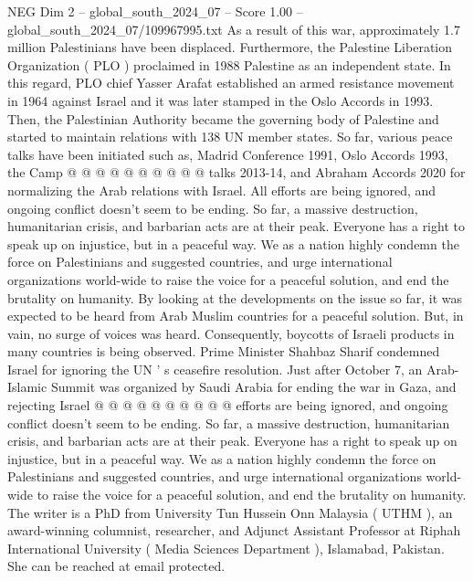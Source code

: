 \begin{textsample}{NEG Dim 2 – global\_south\_2024\_07 – Score 1.00 – global\_south\_2024\_07/109967995.txt}
As a result of this war, approximately 1.7 million Palestinians have been displaced.
Furthermore, the Palestine Liberation Organization ( PLO ) proclaimed in 1988 Palestine as an independent state.
In this regard, PLO chief Yasser Arafat established an armed resistance movement in 1964 against Israel and it was later stamped in the Oslo Accords in 1993.
Then, the Palestinian Authority became the governing body of Palestine and started to maintain relations with 138 UN member states.
So far, various peace talks have been initiated such as, Madrid Conference 1991, Oslo Accords 1993, the Camp @ @ @ @ @ @ @ @ @ @ talks 2013-14, and Abraham Accords 2020 for normalizing the Arab relations with Israel.
All efforts are being ignored, and ongoing conflict doesn't seem to be ending.
So far, a massive destruction, humanitarian crisis, and barbarian acts are at their peak.
Everyone has a right to speak up on injustice, but in a peaceful way.
We as a nation highly condemn the force on Palestinians and suggested countries, and urge international organizations world-wide to raise the voice for a peaceful solution, and end the brutality on humanity.
By looking at the developments on the issue so far, it was expected to be heard from Arab Muslim countries for a peaceful solution.
But, in vain, no surge of voices was heard.
Consequently, boycotts of Israeli products in many countries is being observed.
Prime Minister Shahbaz Sharif condemned Israel for ignoring the UN ' s ceasefire resolution.
Just after October 7, an Arab-Islamic Summit was organized by Saudi Arabia for ending the war in Gaza, and rejecting Israel @ @ @ @ @ @ @ @ @ @ efforts are being ignored, and ongoing conflict doesn't seem to be ending.
So far, a massive destruction, humanitarian crisis, and barbarian acts are at their peak.
Everyone has a right to speak up on injustice, but in a peaceful way.
We as a nation highly condemn the force on Palestinians and suggested countries, and urge international organizations world-wide to raise the voice for a peaceful solution, and end the brutality on humanity.
The writer is a PhD from University Tun Hussein Onn Malaysia ( UTHM ), an award-winning columnist, researcher, and Adjunct Assistant Professor at Riphah International University ( Media Sciences Department ), Islamabad, Pakistan.
She can be reached at email protected.

\end{textsample}
